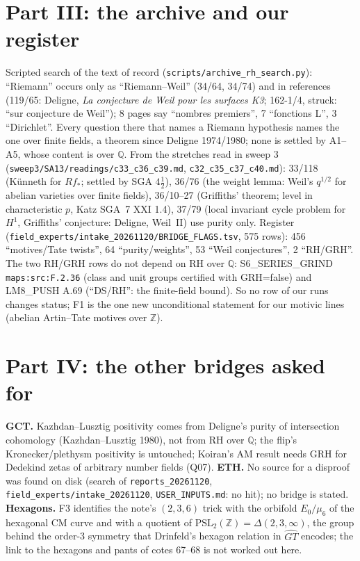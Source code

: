 \documentclass[11pt]{article}
\theoremstyle{definition}\newtheorem{definition}[theorem]{Definition}\newtheorem{remark}[theorem]{Remark}
\begin{document}
\section{Part III: the archive and our register}
Scripted search of the text of record (\texttt{scripts/archive\_rh\_search.py}): ``Riemann'' occurs only as ``Riemann--Weil''
(34/64, 34/74) and in references (119/65: Deligne, \emph{La conjecture de Weil pour les surfaces K3}; 162-1/4, struck: ``sur
conjecture de Weil''); 8 pages say ``nombres premiers'', 7 ``fonctions L'', 3 ``Dirichlet''. Every question there that names a
Riemann hypothesis names the one over finite fields, a theorem since Deligne 1974/1980; none is settled by A1--A5, whose
content is over $\mathbb Q$. From the stretches read in sweep 3 (\texttt{sweep3/SA13/readings/c33\_c36\_c39.md},
\texttt{c32\_c35\_c37\_c40.md}): 33/118 (Künneth for $Rf_*$; settled by SGA $4\tfrac12$), 36/76 (the weight lemma: Weil's
$q^{1/2}$ for abelian varieties over finite fields), 36/10--27 (Griffiths' theorem; level in characteristic $p$, Katz SGA~7 XXI
1.4), 37/79 (local invariant cycle problem for $H^1$, Griffiths' conjecture: Deligne, Weil~II) use purity only.
Register (\texttt{field\_experts/intake\_20261120/BRIDGE\_FLAGS.tsv}, 575 rows): 456 ``motives/Tate twists'', 64
``purity/weights'', 53 ``Weil conjectures'', 2 ``RH/GRH''. The two RH/GRH rows do not depend on RH over $\mathbb Q$:
S6\_SERIES\_GRIND \texttt{maps:src:F.2.36} (class and unit groups certified with GRH=false) and LM8\_PUSH A.69 (``DS/RH'':
the finite-field bound). So no row of our runs changes status; F1 is the one new unconditional statement for our
motivic lines (abelian Artin--Tate motives over $\mathbb Z$).

\section{Part IV: the other bridges asked for}
\textbf{GCT.} Kazhdan--Lusztig positivity comes from Deligne's purity of intersection cohomology (Kazhdan--Lusztig 1980),
not from RH over $\mathbb Q$; the flip's Kronecker/plethysm positivity is untouched; Koiran's AM result needs GRH for Dedekind
zetas of arbitrary number fields (Q07). \textbf{ETH.} No source for a disproof was found on disk (search of
\texttt{reports\_20261120}, \texttt{field\_experts/intake\_20261120}, \texttt{USER\_INPUTS.md}: no hit); no bridge is
stated. \textbf{Hexagons.} F3 identifies the note's $(2,3,6)$ trick with the orbifold $E_0/\mu_6$ of the hexagonal CM curve
and with a quotient of $\mathrm{PSL}_2(\mathbb Z)=\Delta(2,3,\infty)$, the group behind the order-3 symmetry that Drinfeld's
hexagon relation in $\widehat{GT}$ encodes; the link to the hexagons and pants of cotes 67--68 is not worked out here.
\end{document}
